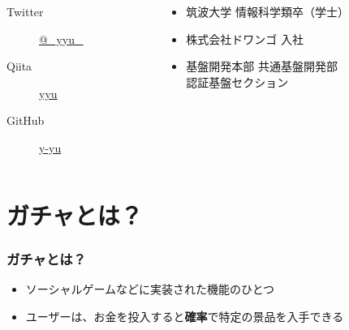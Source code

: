 \begin{frame}
\begin{columns}
\begin{column}{0.4\textwidth}
      \begin{description}
        \item[Twitter] \href{https://twitter.com/\_yyu\_}{@\_yyu\_}
        \item[Qiita] \href{http://qiita.com/yyu}{yyu}
        \item[GitHub] \href{https://github.com/y-yu}{y-yu}
      \end{description}
    \end{column}
    \begin{column}{0.6\textwidth}
      \begin{itemize}
        \item<2-> 筑波大学 情報科学類卒（学士）
        \item<3-> 株式会社ドワンゴ 入社
        \item<4-> 基盤開発本部 共通基盤開発部 \\
          認証基盤セクション
      \end{itemize}
    \end{column}
  \end{columns}
\end{frame}

\section{ガチャとは？}

\begin{frame}
  \frametitle{ガチャとは？}

  \begin{itemize}
    \item<2-> ソーシャルゲームなどに実装された機能のひとつ
    \item<3-> ユーザーは、お金を投入すると\textbf{確率}で特定の景品を入手できる
  \end{itemize}

  \begin{center}


  \end{center}
\end{frame}

